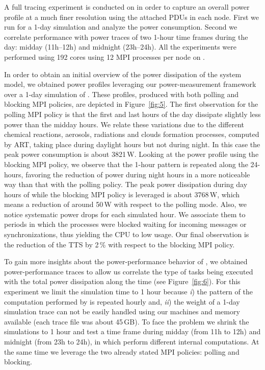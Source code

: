 A full tracing  experiment is conducted on \tinto  in order to capture
an overall power profile at a much finer resolution using the attached
PDUs in each  node. First we run \cosmoart for  a 1-day simulation and
analyze the  power consumption.  Second we  correlate performance with
power  traces  of  two  1-hour  time frames  during  the  day:  midday
(11h--12h) and midnight (23h--24h). All the experiments were performed
using 192 cores using 12 MPI processes per node on \tinto.

In order to obtain an initial overview of the power dissipation of the
system  model,  we  obtained  power  profiles  leveraging  our  \pmlib
power-measurement    framework   over    a    1-day   simulation    of
\cosmoart. These profiles, produced with both polling and blocking MPI
policies,  are depicted in  Figure~\ref{fig:5}. The  first observation
for the polling MPI policy is that the first and last hours of the day
dissipate slightly less  power than the midday hours.  We relate these
variations  due   to  the  different   chemical  reactions,  aerosols,
radiations  and clouds  formation processes,  computed by  ART, taking
place during  daylight hours  but not during  night. In this  case the
peak power consumption is about  3821\,W. Looking at the power profile
using the blocking  MPI policy, we observe that  the 1-hour pattern is
repeated along  the 24-hours, favoring  the reduction of  power during
night  hours in  a  more noticeable  way  than that  with the  polling
policy.   The peak  power dissipation  during day  hours of  while the
blocking  MPI policy  is leveraged  is  about 3768\,W,  which means  a
reduction of around  50\,W with respect to the  polling mode. Also, we
notice systematic  power drops for each simulated  hour.  We associate
them  to periods  in  which  the processes  were  blocked waiting  for
incoming messages  or synchronizations, thus  yielding the CPU  to low
usage. Our final observation is the reduction of the TTS by 2\,\% with
respect to the blocking MPI policy.

To  gain  more  insights   about  the  power-performance  behavior  of
\cosmoart,  we  obtained power-per\-for\-man\-ce  traces  to allow  us
correlate  the type  of  tasks  being executed  with  the total  power
dissipation  along  the   time  (see  Figure~\ref{fig:6}).   For  this
experiment we  limit the simulation  time to 1 hour  because \emph{i})
the  pattern of  the computation  performed by  \cosmoart  is repeated
hourly and, \emph{ii}) the weight  of a 1-day simulation trace can not
be easily handled using our  machines and memory available (each trace
file was about 45\,GB). To  face the problem we shrink the simulations
to 1 hour  and test a time  frame during midday (from 11h  to 12h) and
midnight  (from 23h  to  24h), in  which  \cosmoart perform  different
internal computations.  At  the same time we leverage  the two already
stated MPI policies: polling and blocking.

